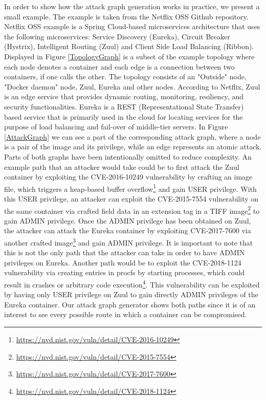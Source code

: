In order to show how the attack graph generation works in practice, we present a small example. The example is taken from the Netflix OSS Github repository. Netflix OSS example is a Spring Cloud-based microservices architecture that uses the following microservices: Service Discovery (Eureka), Circuit Breaker (Hystrix), Intelligent Routing (Zuul) and Client Side Load Balancing (Ribbon). Displayed in Figure \ref{TopologyGraph} is a subset of the example topology where each node denotes a container and each edge is a connection between two containers, if one calls the other. The topology consists of an "Outside" node, "Docker daemon" node, Zuul, Eureka and other nodes. According to Netflix, Zuul is an edge service that provides dynamic routing, monitoring, resiliency, and security functionalities. Eureka is a REST (Representational State Transfer) based service that is primarily used in the cloud for locating services for the purpose of load balancing and fail-over of middle-tier servers. In Figure \ref{AttackGraph} we can see a part of the corresponding attack graph, where a node is a pair of the image and its privilege, while an edge represents an atomic attack. Parts of both graphs have been intentionally omitted to reduce complexity. An example path that an attacker would take could be to first attack the Zuul container by exploiting the CVE-2016-10249 vulnerability by crafting an image file, which triggers a heap-based buffer overflow\footnote{\url{https://nvd.nist.gov/vuln/detail/CVE-2016-10249}} and gain USER privilege.  With this USER privilege, an attacker can exploit the CVE-2015-7554 vulnerability on the same container via crafted field data in an extension tag in a TIFF image\footnote{\url{https://nvd.nist.gov/vuln/detail/CVE-2015-7554}} to gain ADMIN privilege. Once the ADMIN privilege has been obtained on Zuul, the attacker can attack the Eureka container by exploiting CVE-2017-7600 via another crafted image\footnote{\url{https://nvd.nist.gov/vuln/detail/CVE-2017-7600}} and gain ADMIN privilege. It is important to note that this is not the only path that the attacker can take in order to have ADMIN privileges on Eureka. Another path would be to exploit the CVE-2018-1124 vulnerability via creating entries in procfs by starting processes, which could result in crashes or arbitrary code execution\footnote{\url{https://nvd.nist.gov/vuln/detail/CVE-2018-1124}}. This vulnerability can be exploited by having only USER privilege on Zuul to gain directly ADMIN privileges of the Eureka container. Our attack graph generator shows both paths since it is of an interest to see every possible route in which a container can be compromised.



